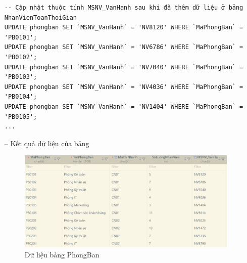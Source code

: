 \begin{itemize}
\begin{verbatim}
-- Cập nhật thuộc tính MSNV_VanHanh sau khi đã thêm dữ liệu ở bảng NhanVienToanThoiGian
UPDATE phongban SET `MSNV_VanHanh` = 'NV8120' WHERE `MaPhongBan` = 'PB0101';
UPDATE phongban SET `MSNV_VanHanh` = 'NV6786' WHERE `MaPhongBan` = 'PB0102';
UPDATE phongban SET `MSNV_VanHanh` = 'NV7040' WHERE `MaPhongBan` = 'PB0103';
UPDATE phongban SET `MSNV_VanHanh` = 'NV4036' WHERE `MaPhongBan` = 'PB0104';
UPDATE phongban SET `MSNV_VanHanh` = 'NV1404' WHERE `MaPhongBan` = 'PB0105';
...
    \end{verbatim}
    \item [--] Kết quả dữ liệu của bảng
    \begin{figure}[H]
        \centering
        \includegraphics[width=\linewidth]{content/images/data_phongban.png}
        \caption{Dữ liệu bảng PhongBan}
        \label{fig:data_phongban}
    \end{figure}
\end{itemize}
\newpage
